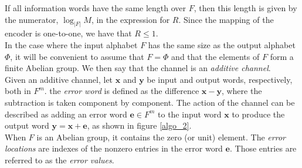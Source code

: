 If all information words have the same length over $F$, then this length is given by the numerator, $\log_{|F|}M$, in the expression for $R$. Since the mapping of the encoder is one-to-one, we have that $R\leq 1$.\\
In the case where the input alphabet $F$ has the same size as the output alphabet $\Phi$, it will be convenient to assume that $F=\Phi$ and that the elements of $F$ form a finite Abelian group. We then say that the channel is an \textit{additive channel}.\\
\indent Given an additive channel, let $\mathbf{x}$ and $\mathbf{y}$ be input and output words, respectively, both in $F^m$. the \textit{error word} is defined as the difference $\mathbf{x}-\mathbf{y}$, where the subtraction is taken component by component. The action of the channel can be described as adding an error word $\mathbf{e}\in F^m$ to the input word $\mathbf{x}$ to produce the output word $\mathbf{y} = \mathbf{x}+\mathbf{e}$, as shown in figure \ref{algo_2}.\\
\indent When $F$ is an Abelian group, it contains the zero (or unit) element. The \textit{error locations} are indexes of the nonzero entries in the error word $\mathbf{e}$. Those entries are referred to as the \textit{error values}.
